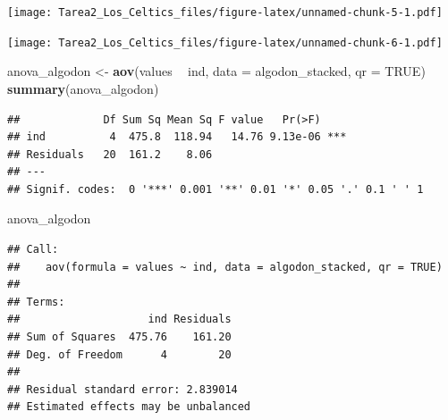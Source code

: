 \documentclass[]{article}
\newenvironment{Shaded}{\begin{snugshade}}{\end{snugshade}}
\newcommand{\KeywordTok}[1]{\textcolor[rgb]{0.13,0.29,0.53}{\textbf{#1}}}
\newcommand{\DataTypeTok}[1]{\textcolor[rgb]{0.13,0.29,0.53}{#1}}
\newcommand{\StringTok}[1]{\textcolor[rgb]{0.31,0.60,0.02}{#1}}
\newcommand{\OtherTok}[1]{\textcolor[rgb]{0.56,0.35,0.01}{#1}}
\newcommand{\OperatorTok}[1]{\textcolor[rgb]{0.81,0.36,0.00}{\textbf{#1}}}
\newcommand{\NormalTok}[1]{#1}
\begin{document}
\texttt{[image: Tarea2\_Los\_Celtics\_files/figure-latex/unnamed-chunk-5-1.pdf]}

\begin{Shaded}
\end{Shaded}

\texttt{[image: Tarea2\_Los\_Celtics\_files/figure-latex/unnamed-chunk-6-1.pdf]}

\begin{Shaded}
\begin{Highlighting}[]
\NormalTok{anova_algodon <-}\StringTok{ }\KeywordTok{aov}\NormalTok{(values }\OperatorTok{~}\StringTok{ }\NormalTok{ind, }\DataTypeTok{data =}\NormalTok{ algodon_stacked, }\DataTypeTok{qr =} \OtherTok{TRUE}\NormalTok{)}
\KeywordTok{summary}\NormalTok{(anova_algodon)}
\end{Highlighting}
\end{Shaded}

\begin{verbatim}
##             Df Sum Sq Mean Sq F value   Pr(>F)    
## ind          4  475.8  118.94   14.76 9.13e-06 ***
## Residuals   20  161.2    8.06                     
## ---
## Signif. codes:  0 '***' 0.001 '**' 0.01 '*' 0.05 '.' 0.1 ' ' 1
\end{verbatim}

\begin{Shaded}
\begin{Highlighting}[]
\NormalTok{anova_algodon}
\end{Highlighting}
\end{Shaded}

\begin{verbatim}
## Call:
##    aov(formula = values ~ ind, data = algodon_stacked, qr = TRUE)
## 
## Terms:
##                    ind Residuals
## Sum of Squares  475.76    161.20
## Deg. of Freedom      4        20
## 
## Residual standard error: 2.839014
## Estimated effects may be unbalanced
\end{verbatim}
\end{document}
